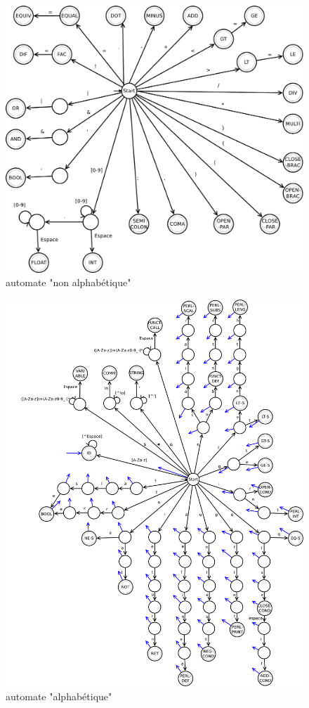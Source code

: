 \documentclass[a4paper,10pt]{article}
\begin{document}
	\begin{figure}[H] \hspace*{-2cm} 
    	\centering
   		  	\includegraphics[width=400pt]{automate1.pdf} 
			\caption{automate "non alphabétique"}
			\label{automate1}
	\end{figure}	
  
  
	\begin{figure}[H] \hspace*{-2cm} 
    	\centering
   	  		\includegraphics[width=450pt]{automate2.pdf} 
			\caption{automate "alphabétique"}
			\label{automate2}
  	\end{figure}	
	
\end{document}
